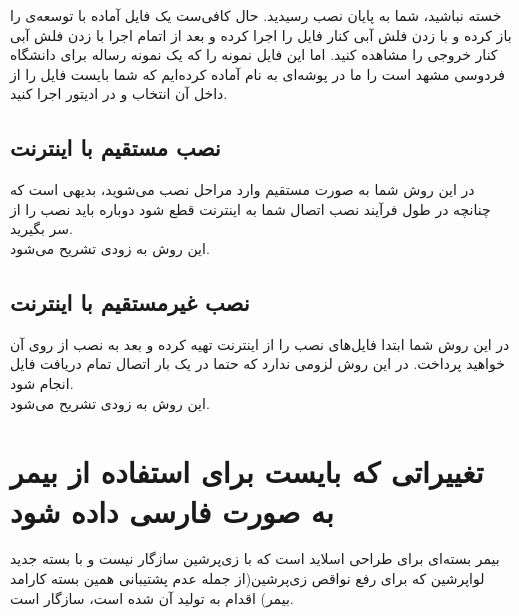 خسته نباشید، شما به پایان نصب رسیدید. حال کافی‌ست یک فایل آماده با توسعه‌ی  را باز کرده و با زدن فلش آبی کنار  فایل را اجرا کرده و بعد از اتمام اجرا با زدن فلش آبی کنار  خروجی را مشاهده کنید. اما این فایل نمونه را که یک نمونه رساله برای دانشگاه فردوسی مشهد است را ما در پوشه‌ای به نام  آماده کرده‌ایم که شما بایست فایل  را از داخل آن انتخاب و در ادیتور  اجرا کنید.
\subsection{نصب مستقیم با اینترنت}
در این روش شما به صورت مستقیم وارد مراحل نصب می‌شوید، بدیهی است که چنانچه در طول فرآیند نصب اتصال شما به اینترنت قطع شود دوباره باید نصب را از سر بگیرید.\\
این روش به زودی تشریح می‌شود.
\subsection{نصب غیرمستقیم با اینترنت}
در این روش شما ابتدا فایل‌های نصب را از اینترنت تهیه کرده و بعد به نصب از روی آن خواهید پرداخت. در این روش لزومی ندارد که حتما در یک بار اتصال تمام دریافت فایل انجام شود.\\
این روش به زودی تشریح می‌شود.
\section{تغییراتی که بایست برای استفاده از بیمر به صورت فارسی داده شود}
بیمر بسته‌ای برای طراحی اسلاید است که با زی‌پرشین سازگار نیست و با بسته جدید لواپرشین که برای رفع نواقص زی‌پرشین(از جمله عدم پشتیبانی همین بسته کارامد بیمر) اقدام به تولید آن شده است، سازگار است.

